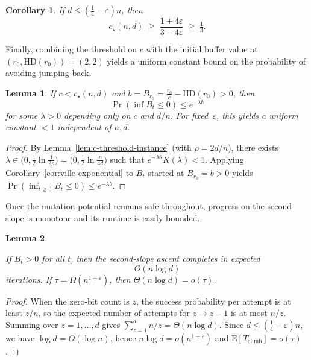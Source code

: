 \documentclass[lettersize,journal]{IEEEtran}
\newcommand{\EE}{\text{E}}
\newtheorem{corollary}{Corollary}
\newtheorem{lemma}{Lemma}
\begin{document}
{\begin{corollary}If $d\le (\tfrac14-\varepsilon)n$, then
	\[
	c_\star(n,d) \;\ge\; \frac{1+4\varepsilon}{3-4\varepsilon} \;\ge\; \tfrac13.
	\]
\end{corollary}
\label{cor:c-floor}



Finally, combining the threshold on $c$ with the initial buffer value at 
$(r_0,\mathrm{HD}(r_0))=(2,2)$ yields a uniform constant bound on the 
probability of avoiding jumping back.

\begin{lemma}
\label{lem:param-constant-c-general}
	If $c<c_\star(n,d)$ and 
	$b=B_{r_0}=\frac{r_0}{c}-\mathrm{HD}(r_0)>0$, 
	then 
	\[
	\Pr\!\left(\inf B_t \le 0\right) \le e^{-\lambda b}
	\]
	for some $\lambda>0$ depending only on $c$ and $d/n$.  
	For fixed~$\varepsilon$, this yields a uniform constant $<1$ independent of 
	$n,d$.
\end{lemma}

\begin{proof}
	By Lemma~\ref{lem:c-threshold-instance} (with $\rho=2d/n$), there exists
	$\lambda\in\big(0,\tfrac12\ln\tfrac{1}{2\rho}\big)=\big(0,\tfrac12\ln\tfrac{n}{4d}\big)$
	such that $e^{-\lambda\theta}K(\lambda)<1$. Applying Corollary~\ref{cor:ville-exponential}
	to $B_t$ started at $B_{r_0}=b>0$ yields
	$\Pr(\inf_{t\ge 0} B_t\le 0)\le e^{-\lambda b}$.
\end{proof}

Once the mutation potential remains safe throughout, progress on the second 
slope is monotone and its runtime is easily bounded.



\begin{lemma}\label{prop:climb-time}
	
	If $B_t>0$ for all $t$, then the second-slope ascent completes in expected
	\[
	\Theta(n\log d)
	\]
	iterations.  
	If $\tau=\Omega(n^{1+\varepsilon})$, then $\Theta(n\log d)=o(\tau)$.
\end{lemma}

\begin{proof}
	When the zero-bit count is $z$, the success probability per attempt is at least $z/n$, so the expected number of attempts for $z\!\to\! z-1$ is at most $n/z$.
	Summing over $z=1,\dots,d$ gives $\sum_{z=1}^{d}n/z=\Theta(n\log d)$.
	Since $d\le(\tfrac14-\varepsilon)n$, we have $\log d=O(\log n)$, hence $n\log d=o(n^{1+\varepsilon})$ and $\EE[T_{\mathrm{climb}}]=o(\tau)$.
\end{proof}


}
\end{document}
